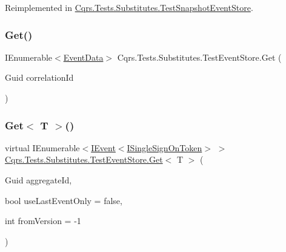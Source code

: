 Reimplemented in \hyperlink{classCqrs_1_1Tests_1_1Substitutes_1_1TestSnapshotEventStore_a7acb01defa795be81fc14a19ae703970}{Cqrs.\+Tests.\+Substitutes.\+Test\+Snapshot\+Event\+Store}.

\mbox{\label{classCqrs_1_1Tests_1_1Substitutes_1_1TestEventStore_afde308e712368690629564a1001928e6}} 
\subsubsection{\texorpdfstring{Get()}{Get()}\hspace{0.1cm}{\footnotesize\ttfamily [2/2]}}
{\footnotesize\ttfamily I\+Enumerable$<$\hyperlink{classCqrs_1_1Events_1_1EventData}{Event\+Data}$>$ Cqrs.\+Tests.\+Substitutes.\+Test\+Event\+Store.\+Get (\begin{DoxyParamCaption}\item[{Guid}]{correlation\+Id }\end{DoxyParamCaption})}

\mbox{\label{classCqrs_1_1Tests_1_1Substitutes_1_1TestEventStore_a3cbf3e72012e13320cf4d9bb47e9face}} 
\subsubsection{\texorpdfstring{Get$<$ T $>$()}{Get< T >()}}
{\footnotesize\ttfamily virtual I\+Enumerable$<$\hyperlink{interfaceCqrs_1_1Events_1_1IEvent}{I\+Event}$<$\hyperlink{interfaceCqrs_1_1Authentication_1_1ISingleSignOnToken}{I\+Single\+Sign\+On\+Token}$>$ $>$ \hyperlink{classCqrs_1_1Tests_1_1Substitutes_1_1TestEventStore_a58e89fab7fdfafff88c62317b6765e55}{Cqrs.\+Tests.\+Substitutes.\+Test\+Event\+Store.\+Get}$<$ T $>$ (\begin{DoxyParamCaption}\item[{Guid}]{aggregate\+Id,  }\item[{bool}]{use\+Last\+Event\+Only = {\ttfamily false},  }\item[{int}]{from\+Version = {\ttfamily -\/1} }\end{DoxyParamCaption})\hspace{0.3cm}{\ttfamily [virtual]}}

